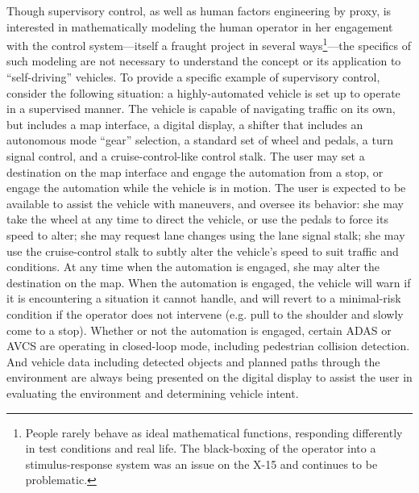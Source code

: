 Though supervisory control, as well as human factors engineering by proxy, is
interested in mathematically modeling the human operator in her
engagement with the control system---itself a fraught project in
several ways\footnote{People rarely behave as ideal mathematical
  functions, responding differently in test conditions and real life.
  The black-boxing of the operator into a stimulus-response 
system was an issue on the X-15 \cite[p. 54]{DM} and continues to be
problematic.}---the specifics of such modeling are not necessary to 
understand the concept or its application to ``self-driving'' vehicles. To provide
a specific example of supervisory control, consider the following
situation: a highly-automated vehicle is set up to operate in a
supervised manner. The vehicle is capable of navigating traffic on its
own, but includes a map interface, a digital display, a shifter that includes an
autonomous mode ``gear'' selection, a standard set of wheel and
pedals, a turn signal control,
and a cruise-control-like control stalk. The user may set a
destination on the map interface and engage the automation from a stop, or engage
the automation while the vehicle is in motion. The user is expected to
be available to assist the vehicle with maneuvers, and oversee its
behavior:  she may take the wheel at any time to direct the vehicle,
or use the pedals to force its speed to alter; she may request lane
changes using the lane signal stalk; she may use the cruise-control
stalk to subtly alter the vehicle's speed to suit traffic and
conditions. At any time when the automation is engaged, she may alter
the destination on the map. When the automation is engaged, the
vehicle will warn if it is encountering a situation it cannot handle,
and will revert to a minimal-risk condition if the operator does not
intervene (e.g. pull to the shoulder and slowly come to a stop).
Whether or not the automation is engaged,
certain ADAS or AVCS are operating in closed-loop mode, including
pedestrian collision detection. And vehicle data including detected
objects and planned paths through the environment are always being
presented on the digital display to assist the user in evaluating the
environment and determining vehicle intent.

